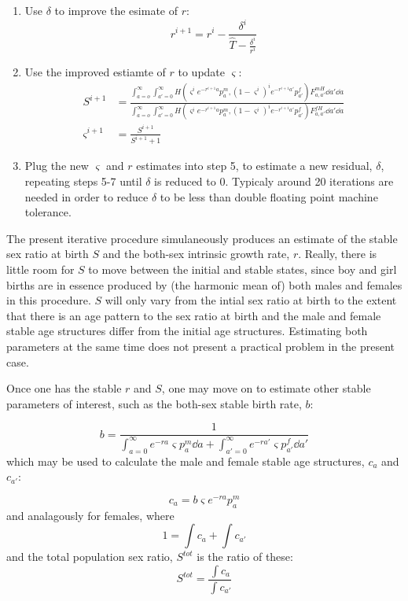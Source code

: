 \begin{enumerate}
  \item Use $\delta$ to improve the esimate of $r$:
  \begin{equation}
  r^{i+1} = r^i - \frac{\delta^i}{\widehat{T} - \frac{\delta^i}{r^i}}
  \end{equation}
  \item Use the improved estiamte of $r$ to update $\varsigma$:
  \begin{align}
  S^{i+1} &= \frac{\int_{a=o}^\infty \int_{a'=0}^\infty H(\varsigma^i
  e^{-r^{i+1}a} p_a^m, (1-\varsigma^i)^i e^{-r^{i+1}a'}p_{a'}^f) F_{a,a'}^{mH} \dd a' \dd a
  }{\int_{a=o}^\infty \int_{a'=0}^\infty H(\varsigma^i e^{-r^{i+1}a}
  p_a^m, (1-\varsigma^i)^i e^{-r^{i+1}a'}p_{a'}^f) F_{a,a'}^{fH} \dd a' \dd a }
  \\
  \varsigma^{i+1} &= \frac{S^{i+1}}{S^{i+1}+1}
  \end{align}
  \item Plug the new $\varsigma$ and $r$ estimates into step 5, to estimate a
  new residual, $\delta$, repeating steps 5-7 until $\delta$ is reduced to 0.
  Typicaly around 20 iterations are needed in order to reduce $\delta$ to
  be less than double floating point machine tolerance.
\end{enumerate}

The present iterative procedure simulaneously produces an estimate of the stable
sex ratio at birth $S$ and the both-sex intrinsic growth rate, $r$. Really,
there is little room for $S$ to move between the initial and stable states,
since boy and girl births are in essence produced by (the harmonic mean of) both
males and females in this procedure. $S$
will only vary from the intial sex ratio at birth to the extent that there is
an age pattern to the sex ratio at birth and the male and female stable age
structures differ from the initial age structures. Estimating both parameters at
the same time does not present a practical problem in the present case.

Once one has the stable $r$ and $S$, one may move on to estimate other stable
parameters of interest, such as the both-sex stable birth rate, $b$:

\begin{equation}
b = \frac{1}{\int_{a = 0}^\infty e^{-ra} \varsigma p_a^m \dd a + \int_{a' =
0}^\infty e^{-ra'} \varsigma p_{a'}^f \dd a'}
\end{equation}
which may be used to calculate the male and female stable age structures, $c_a$
and $c_{a'}$:

\begin{equation}
c_a =  b\varsigma  e^{-ra} p_a^m
\end{equation}
and analagously for females, where
\begin{equation}
1 = \int c_a + \int c_{a'}
\end{equation}
and the total population sex ratio, $S^{tot}$ is the ratio of these:
\begin{equation}
S^{tot} = \frac{\int c_a}{\int c_{a'}}
\end{equation}

